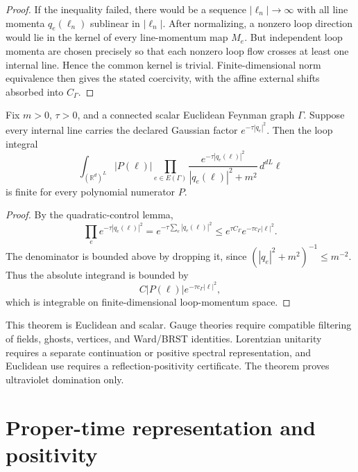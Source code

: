 \documentclass[11pt]{article}
\begin{document}
\begin{proof}
If the inequality failed, there would be a sequence \(|\ell_n|\to\infty\) with all line momenta \(q_e(\ell_n)\) sublinear in \(|\ell_n|\). After normalizing, a nonzero loop direction would lie in the kernel of every line-momentum map \(M_e\). But independent loop momenta are chosen precisely so that each nonzero loop flow crosses at least one internal line. Hence the common kernel is trivial. Finite-dimensional norm equivalence then gives the stated coercivity, with the affine external shifts absorbed into \(C_\Gamma\).
\end{proof}

\begin{theorem}
Fix \(m>0\), \(\tau>0\), and a connected scalar Euclidean Feynman graph \(\Gamma\). Suppose every internal line carries the declared Gaussian factor \(e^{-\tau |q_e|^2}\). Then the loop integral
\[
        \int_{(\mathbb R^d)^L}
        |P(\ell)|
        \prod_{e\in E(\Gamma)}
        \frac{e^{-\tau |q_e(\ell)|^2}}
        {|q_e(\ell)|^2+m^2}
        \,d^{dL}\ell
\]
is finite for every polynomial numerator \(P\).
\end{theorem}

\begin{proof}
By the quadratic-control lemma,
\[
        \prod_e e^{-\tau |q_e(\ell)|^2}
        =
        e^{-\tau\sum_e |q_e(\ell)|^2}
        \le
        e^{\tau C_\Gamma}e^{-\tau c_\Gamma|\ell|^2}.
\]
The denominator is bounded above by dropping it, since \((|q_e|^2+m^2)^{-1}\le m^{-2}\). Thus the absolute integrand is bounded by
\[
        C |P(\ell)|e^{-\tau c_\Gamma|\ell|^2},
\]
which is integrable on finite-dimensional loop-momentum space.
\end{proof}

\begin{remark}
This theorem is Euclidean and scalar.  Gauge theories require compatible filtering of fields,
ghosts, vertices, and Ward/BRST identities.  Lorentzian unitarity requires a separate
continuation or positive spectral representation, and Euclidean use requires a
reflection-positivity certificate.  The theorem proves ultraviolet domination only.
\end{remark}

\section{Proper-time representation and positivity}
\end{document}
